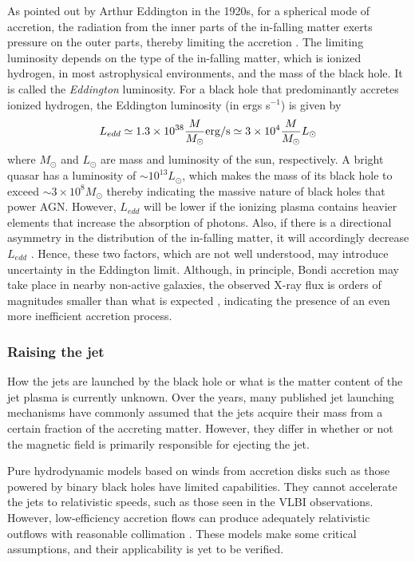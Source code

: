 As pointed out by Arthur Eddington in the 1920s, for a spherical mode of accretion, the radiation from the inner parts of the in-falling matter exerts pressure on the outer parts, thereby limiting the accretion%
. The limiting luminosity depends on the type of the in-falling matter, which is ionized hydrogen, in most astrophysical environments, and the mass of the black hole. It is called the \textit{Eddington} luminosity. For a black hole that predominantly accretes ionized hydrogen, the Eddington luminosity (in ergs s$^{-1}$) is given by
\begin{equation}
    L_{edd}\simeq1.3\times10^{38}\frac{M}{M_\odot}{\rm erg/
    s} 
    \simeq 3\times10^4\frac{M}{M_\odot}L_\odot
\end{equation}
where $M_\odot$ and $L_\odot$ are mass and luminosity of the sun, respectively. A bright quasar has a luminosity of $\sim10^{13}L_\odot$, which makes the mass of its black hole to exceed $\sim3\times10^8M_\odot$ thereby indicating the massive nature of black holes that power AGN. However, $L_{edd}$ will be lower if the ionizing plasma contains heavier elements that increase the absorption of photons. Also, if there is a directional asymmetry in the distribution of the in-falling matter, it will accordingly decrease $L_{edd}$ \citep{frank2002accretion}. Hence, these two factors, which are not well understood, may introduce uncertainty in the Eddington limit.
Although, in principle, Bondi accretion may take place in nearby non-active galaxies, the observed X-ray flux is orders of magnitudes smaller than what is expected \citep[e.g.,][]{wong2011resolving}, indicating the presence of an even more inefficient accretion process.



\subsubsection{Raising the jet}
How the jets are launched by the black hole or what is the matter content of the jet plasma is currently unknown. Over the years, many published jet launching mechanisms have commonly assumed that the jets acquire their mass from a certain fraction of the accreting matter. However, they differ in whether or not the magnetic field is primarily responsible for ejecting the jet.

Pure hydrodynamic models based on winds from accretion disks such as those powered by binary black holes \citep[e.g.,][]{1973A&A....24..337S} have limited capabilities. They cannot accelerate the jets to relativistic speeds, such as those seen in the VLBI observations. However, low-efficiency accretion flows can produce adequately relativistic outflows with reasonable collimation \citep{rees1982ion,das1998observational}. These models make some critical assumptions, and their applicability is yet to be verified.

